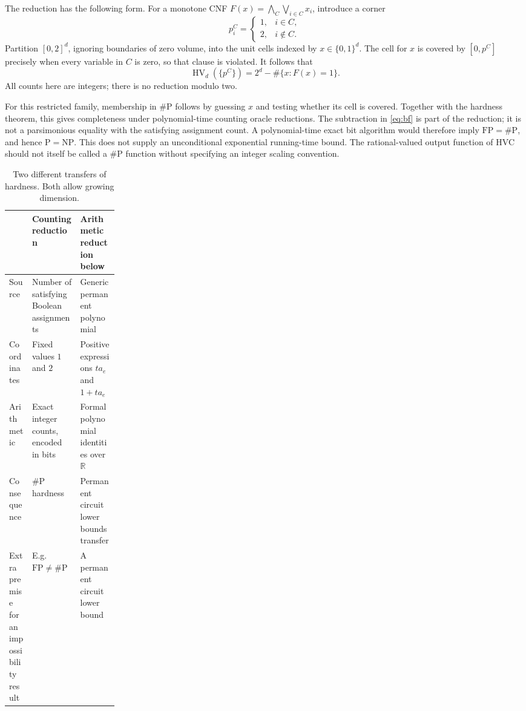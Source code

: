 \documentclass[12pt,a4paper]{article}
\theoremstyle{definition}
\theoremstyle{remark}
\newcommand{\R}{\mathbb R}
\newcommand{\HV}{\operatorname{HV}}
\begin{document}
The reduction has the following form. For a monotone CNF
$F(x)=\bigwedge_C\bigvee_{i\in C}x_i$, introduce a corner
\[
 p^C_i=\begin{cases}1,&i\in C,\\2,&i\notin C.\end{cases}
\]
Partition $[0,2]^d$, ignoring boundaries of zero volume, into the unit
cells indexed by $x\in\{0,1\}^d$. The cell for $x$ is covered by
$[0,p^C]$ precisely when every variable in $C$ is zero, so that clause
is violated. It follows that
\begin{equation}
 \HV_d(\{p^C\})=2^d-\#\{x:F(x)=1\}.
 \label{eq:bf}
\end{equation}
All counts here are integers; there is no reduction modulo two.

For this restricted family, membership in $\#\mathrm P$ follows by
guessing $x$ and testing whether its cell is covered. Together with the
hardness theorem, this gives completeness under polynomial-time
counting oracle reductions. The subtraction in \eqref{eq:bf} is part
of the reduction; it is not a parsimonious equality with the satisfying
assignment count. A polynomial-time exact bit algorithm would therefore
imply $\mathrm{FP}=\#\mathrm P$, and hence $\mathrm P=\mathrm{NP}$.
This does not supply an unconditional exponential running-time bound.
The rational-valued output function of HVC should not itself be called a
$\#\mathrm P$ function without specifying an integer scaling convention.

\begin{table}[htbp]
\centering
\caption{Two different transfers of hardness. Both allow growing dimension.}
\label{tab:comparison}
\renewcommand{\arraystretch}{1.16}
\begin{tabularx}{\linewidth}{@{}p{0.21\linewidth}XX@{}}
\toprule
 & Counting reduction & Arithmetic reduction below\\
\midrule
Source & Number of satisfying Boolean assignments & Generic permanent polynomial\\
Coordinates & Fixed values $1$ and $2$ & Positive expressions $ta_e$ and $1+ta_e$\\
Arithmetic & Exact integer counts, encoded in bits & Formal polynomial identities over $\R$\\
Consequence & $\#\mathrm P$ hardness & Permanent circuit lower bounds transfer\\
Extra premise for an impossibility result & E.g.\ $\mathrm{FP}\ne\#\mathrm P$ & A permanent circuit lower bound\\
\bottomrule
\end{tabularx}
\end{table}
\end{document}
